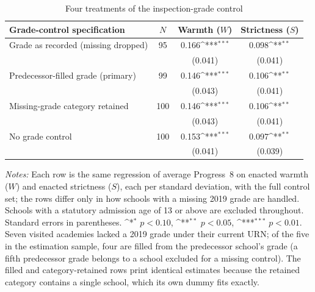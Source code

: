 \begin{table}[htbp]\centering
\caption{Four treatments of the inspection-grade control}
\label{tab:spec_ladder}
\def\sym#1{\ifmmode^{#1}\else\(^{#1}\)\fi}
\small
\begin{tabular}{lccc}
\toprule
Grade-control specification & $N$ & Warmth ($W$) & Strictness ($S$) \\
\midrule
Grade as recorded (missing dropped)      &  95 & 0.166\sym{***}  & 0.098\sym{**}   \\
                                         &     & (0.041)        & (0.041)        \\
\addlinespace
Predecessor-filled grade (primary)       &  99 & 0.146\sym{***}  & 0.106\sym{**}   \\
                                         &     & (0.043)        & (0.041)        \\
\addlinespace
Missing-grade category retained          & 100 & 0.146\sym{***}  & 0.106\sym{**}   \\
                                         &     & (0.043)        & (0.041)        \\
\addlinespace
No grade control                         & 100 & 0.153\sym{***}  & 0.097\sym{**}   \\
                                         &     & (0.041)        & (0.039)        \\
\bottomrule
\end{tabular}
\begin{minipage}{\linewidth}
\smallskip
\footnotesize\textit{Notes:} Each row is the same regression of average Progress~8 on enacted warmth ($W$) and enacted strictness ($S$), each per standard deviation, with the full control set; the rows differ only in how schools with a missing 2019 grade are handled. Schools with a statutory admission age of 13 or above are excluded throughout. Standard errors in parentheses.
\sym{*} \(p<0.10\), \sym{**} \(p<0.05\), \sym{***} \(p<0.01\).
Seven visited academies
lacked a 2019 grade under their current URN; of the five in the estimation sample,
four are filled from the predecessor school's grade (a fifth predecessor grade
belongs to a school excluded for a missing control). The filled and category-retained
rows print identical estimates because the retained category contains a single school,
which its own dummy fits exactly.
\end{minipage}
\end{table}
